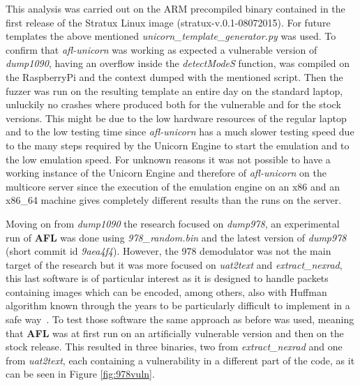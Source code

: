 \documentclass[../main.tex]{subfiles}
\begin{document}
This analysis was carried out on the ARM precompiled binary contained in the
first release of the Stratux Linux image (stratux-v.0.1-08072015). For future
templates the above mentioned \textit{unicorn\_template\_generator.py} was used.
To confirm that \textit{afl-unicorn} was working as expected a vulnerable
version of \textit{dump1090}, having an overflow inside the \textit{detectModeS}
function, was compiled on the RaspberryPi and the context dumped with the
mentioned script. Then the fuzzer was run on the resulting template an entire
day on the standard laptop, unluckily no crashes where produced both for the
vulnerable and for the stock versions. This might be due to the low hardware
resources of the regular laptop and to the low testing time since
\textit{afl-unicorn} has a much slower testing speed due to the many steps
required by the Unicorn Engine to start the emulation and to the low emulation
speed. For unknown reasons it was not possible to have a working instance of the
Unicorn Engine and therefore of \textit{afl-unicorn} on the multicore server
since the execution of the emulation engine on an x86 and an x86\_64 machine
gives completely different results than the runs on the server.

Moving on from \textit{dump1090} the research focused on \textit{dump978}, an
experimental run of \textbf{AFL} was done using \textit{978\_random.bin} and the
latest version of \textit{dump978} (short commit id \textit{9aea4f4}). However,
the 978 demodulator was not the main target of the research but it was more
focused on \textit{uat2text} and \textit{extract\_nexrad}, this last software is
of particular interest as it is designed to handle packets containing images
which can be encoded, among others, also with Huffman algorithm known through
the years to be particularly difficult to implement in a safe
way~\cite{cve20176890, cve20074537}. To test those software the same approach as
before was used, meaning that \textbf{AFL} was at first run on an artificially
vulnerable version and then on the stock release. This resulted in three
binaries, two from \textit{extract\_nexrad} and one from \textit{uat2text}, each
containing a vulnerability in a different part of the code, as it can be seen in
Figure \ref{fig:978vuln}.
\end{document}
